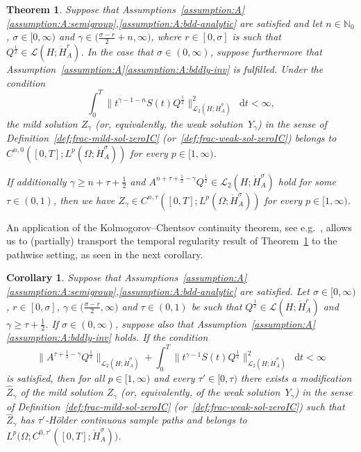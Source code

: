 \documentclass[reqno]{amsart}
\numberwithin{equation}{section}
\newcommand{\N}{\mathbb{N}}
\newcommand{\rd}{\mathop{}\!\mathrm{d}}
\newcommand{\Hdot}[1]{\dot{H}^{#1}_A}
\newtheorem{theorem}[lemma]{Theorem}
\newtheorem{corollary}[lemma]{Corollary}
\theoremstyle{remark}
\theoremstyle{definition}
\begin{document}
\begin{theorem}\label{thm:temporal-regularity}
	Suppose that 
	Assumptions~\textup{\ref{assumption:A}\ref{assumption:A:semigroup},\ref{assumption:A:bdd-analytic}} 
	are satisfied and let  
	$n \in \N_0$,  
	$\sigma\in[0,\infty)$  
	and  
	$\gamma \in \bigl( \frac{\sigma-r}{2} +n ,\infty \bigr)$, 
	where $r\in[0,\sigma]$ is such that 
	$Q^{\frac{1}{2}} \in \mathscr L(H;\dot H_A^r)$. 
	In the case that $\sigma\in(0,\infty)$, 
	suppose furthermore that 
	Assumption~\textup{\ref{assumption:A}\ref{assumption:A:bddly-inv}} 
	is fulfilled. 
	Under the condition  
	\begin{equation}\label{eq:stoch-conv-diffb-assump} 
	\int_0^T
	\bigl\| t^{\gamma-1-n} S(t) Q^{\frac{1}{2}} \bigr\|_{ 
		\mathscr L_2(H; \Hdot{\sigma})}^2 \rd t 
	< \infty,
	\end{equation} 
	the mild solution $Z_\gamma$ 
	(or, equivalently, the weak solution~$Y_\gamma$) 
	in the sense of 
	Definition~\textup{\ref{def:frac-mild-sol-zeroIC}} 
	(or~\textup{\ref{def:frac-weak-sol-zeroIC}}) 
	belongs to 
	$C^{n,0}([0,T];L^p(\Omega;\dot H^\sigma_A))$ 
	for every $p \in [1,\infty)$. 
	
	If additionally 
	$\gamma\geq n + \tau + \frac{1}{2}$ and 
	$A^{n+\tau+\frac{1}{2} -\gamma} Q^{\frac{1}{2}} \in \mathscr L_2(H; \dot H_A^\sigma)$ 
	hold for some $\tau\in (0,1)$, 
	then we have 
	$Z_\gamma\in C^{n,\tau}([0,T];L^p(\Omega;\dot H^\sigma_A))$ 
	for every $p \in [1,\infty)$. 
\end{theorem} 

An application of the Kolmogorov--Chentsov 
continuity theorem, 
see e.g.~\cite[Theorem~3.9]{Cox2021local}, 
allows us to (partially) transport 
the temporal regularity result of 
Theorem~\ref{thm:temporal-regularity} 
to the pathwise setting, 
as seen in the next corollary. 

\begin{corollary}\label{cor:temporal-regularity-pathwise}
	Suppose that 
	Assumptions~\textup{\ref{assumption:A}\ref{assumption:A:semigroup},\ref{assumption:A:bdd-analytic}} 
	are satisfied. Let  
	$\sigma\in[0,\infty)$, 
	$r\in[0,\sigma]$, 
	$\gamma \in \bigl(\frac{\sigma-r}{2},\infty\bigr)$ 
	and  
	$\tau \in (0,1)$ 
	be such that 
	$Q^{\frac{1}{2}} \in \mathscr L(H;\dot H_A^r)$ 
	and 
	$\gamma \geq \tau + \frac{1}{2}$. 
	If ${\sigma\in(0,\infty)}$, suppose
	also that 
	Assumption~\textup{\ref{assumption:A}\ref{assumption:A:bddly-inv}} 
	holds.  
	If the condition 
	\[ 
	\bigl\| A^{\tau+\frac{1}{2}-\gamma} Q^{\frac{1}{2}} 
	\bigr\|_{\mathscr L_2(H;\dot H_A^\sigma)}
	+ 
	\int_0^T
	\bigl\| t^{\gamma-1} S(t) Q^{\frac{1}{2}} 
	\bigr\|_{\mathscr L_2(H; \Hdot{\sigma})}^2 \rd t 
	< 
	\infty 
	\] 
	is satisfied, then 
	for all $p \in [1,\infty)$ 
	and every $\tau'\in[0,\tau)$ 
	there exists a modification 
	$\widehat{Z}_\gamma$ of 
	the mild solution $Z_\gamma$ 
	(or, equivalently, of the weak solution~$Y_\gamma$) 
	in the sense of 
	Definition~\textup{\ref{def:frac-mild-sol-zeroIC}}  
	(or~\textup{\ref{def:frac-weak-sol-zeroIC}}) 
	such that 
	$\widehat{Z}_\gamma$ 
	has $\tau'$-H\"older continuous 
	sample paths and 
	belongs to 
	$L^p\bigl( \Omega; C^{0,\tau'}([0,T]; \dot H^\sigma_A) \bigr)$. 
\end{corollary}
\end{document}
